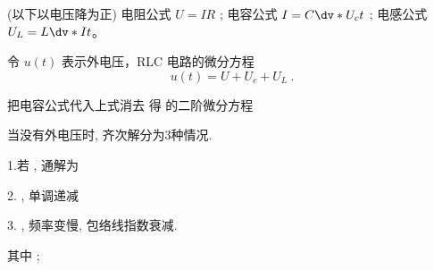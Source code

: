 

(以下以电压降为正)
电阻公式 $U=IR$ ; 电容公式 $I=C\dv*{U_c}{t}$ ; 电感公式 $U_L=L\dv*{I}{t}$。

令 $u(t)$ 表示外电压，RLC 电路的微分方程
\begin{equation}
u(t) = U + U_c + U_L~.
\end{equation}

 
把电容公式代入上式消去 得 的二阶微分方程
 
当没有外电压时, 齐次解分为3种情况.

1.若 , 通解为
 
2.  , 单调递减
 
3.  , 频率变慢, 包络线指数衰减.
 
其中 ;  
